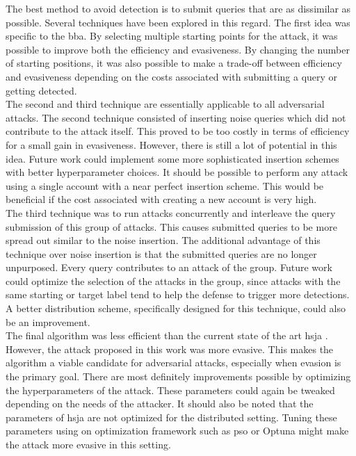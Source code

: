 The best method to avoid detection is to submit queries that are as dissimilar as possible. Several techniques have been explored in this regard. The first idea was specific to the \gls{bba}. By selecting multiple starting points for the attack, it was possible to improve both the efficiency and evasiveness. By changing the number of starting positions, it was also possible to make a trade-off between efficiency and evasiveness depending on the costs associated with submitting a query or getting detected.\\

The second and third technique are essentially applicable to all adversarial attacks. The second technique consisted of inserting noise queries which did not contribute to the attack itself. This proved to be too costly in terms of efficiency for a small gain in evasiveness. However, there is still a lot of potential in this idea. Future work could implement some more sophisticated insertion schemes with better hyperparameter choices. It should be possible to perform any attack using a single account with a near perfect insertion scheme. This would be beneficial if the cost associated with creating a new account is very high.\\

The third technique was to run attacks concurrently and interleave the query submission of this group of attacks. This causes submitted queries to be more spread out similar to the noise insertion. The additional advantage of this technique over noise insertion is that the submitted queries are no longer unpurposed. Every query contributes to an attack of the group. Future work could optimize the selection of the attacks in the group, since attacks with the same starting or target label tend to help the defense to trigger more detections. A better distribution scheme, specifically designed for this technique, could also be an improvement.\\

The final algorithm was less efficient than the current state of the art \gls{hsja} \cite{hsja}. However, the attack proposed in this work was more evasive. This makes the algorithm a viable candidate for adversarial attacks, especially when evasion is the primary goal. There are most definitely improvements possible by optimizing the hyperparameters of the attack. These parameters could again be tweaked depending on the needs of the attacker. It should also be noted that the parameters of \gls{hsja} are not optimized for the distributed setting. Tuning these parameters using on optimization framework such as \gls{pso} or Optuna \cite{optuna} might make the attack more evasive in this setting.\\

